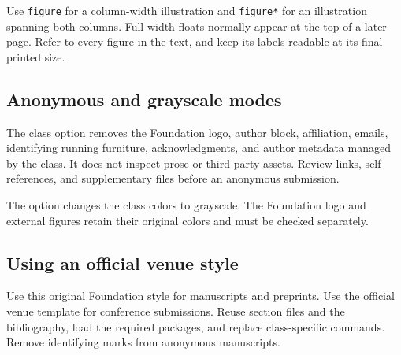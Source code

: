 Use \verb|figure| for a column-width illustration and
\verb|figure*| for an illustration spanning both columns. Full-width
floats normally appear at the top of a later page. Refer to every figure
in the text, and keep its labels readable at its final printed size.

\subsection{Anonymous and grayscale modes}
The  class option removes the Foundation logo, author block,
affiliation, emails, identifying running furniture, acknowledgments, and
author metadata managed by the class. It does not inspect prose or
third-party assets. Review links, self-references, and supplementary files
before an anonymous submission.

The  option changes the class colors to grayscale.
The Foundation logo and external figures retain their original colors and must be
checked separately.

\subsection{Using an official venue style}
Use this original Foundation style for manuscripts and preprints. Use the official
venue template for conference submissions. Reuse section files and the
bibliography, load the required packages, and replace class-specific commands.
Remove identifying marks from anonymous manuscripts.
